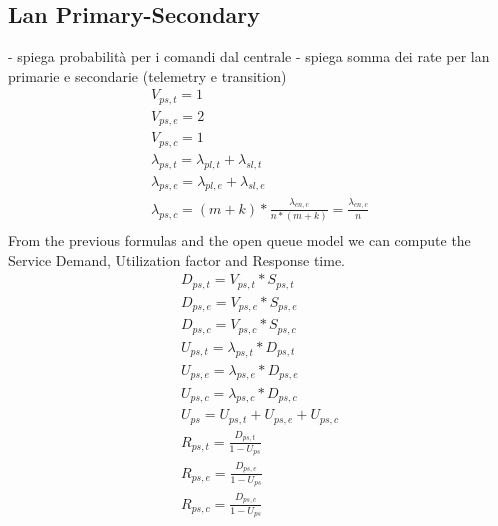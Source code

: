 \documentclass[11pt]{article}
\begin{document}
\subsection{Lan Primary-Secondary}
- spiega probabilità per i comandi dal centrale
- spiega somma dei rate per lan primarie e secondarie (telemetry e transition)
\begin{equation}
    \begin{array}{l}
        V_{ps, t} = 1 \\
        V_{ps, e} = 2 \\ %
        V_{ps,c} = 1 \\
				\lambda_{ps, t} = \lambda_{pl, t} + \lambda_{sl,t} \\
				\lambda_{ps, e} = \lambda_{pl, e} + \lambda_{sl,e} \\
				\lambda_{ps, c} = (m+k)*\frac{\lambda_{cn, c}}{n*(m+k)} = \frac{\lambda_{cn, c}}{n} \\
    \end{array}
\end{equation}
From the previous formulas and the open queue model we can compute the Service Demand, Utilization factor and Response time.
\begin{equation}
    \begin{array}{l}
        D_{ps, t} = V_{ps, t} * S_{ps, t} \\
        D_{ps, e} = V_{ps, e} * S_{ps, e} \\
        D_{ps, c} = V_{ps, c} * S_{ps, c} \\
        U_{ps, t} = \lambda_{ps, t} * D_{ps, t} \\
        U_{ps, e} = \lambda_{ps, e} * D_{ps, e} \\
        U_{ps, c} = \lambda_{ps, c} * D_{ps, c} \\
        U_{ps} = U_{ps, t} + U_{ps, e} + U_{ps, c} \\
        R_{ps, t} = \frac{D_{ps, t}}{1 - U_{ps}} \\
        R_{ps, e} = \frac{D_{ps, e}}{1 - U_{ps}} \\
        R_{ps, c} = \frac{D_{ps, c}}{1 - U_{ps}} \\
    \end{array}
\end{equation}
\end{document}
